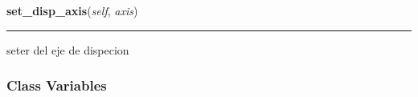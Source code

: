 \hspace{.8\funcindent}\begin{boxedminipage}{\funcwidth}

    \raggedright \textbf{set\_disp\_axis}(\textit{self}, \textit{axis})

    \vspace{-1.5ex}

    \rule{\textwidth}{0.5\fboxrule}
\setlength{\parskip}{2ex}
    seter del eje de dispecion

\setlength{\parskip}{1ex}
    \end{boxedminipage}



  \subsubsection{Class Variables}

